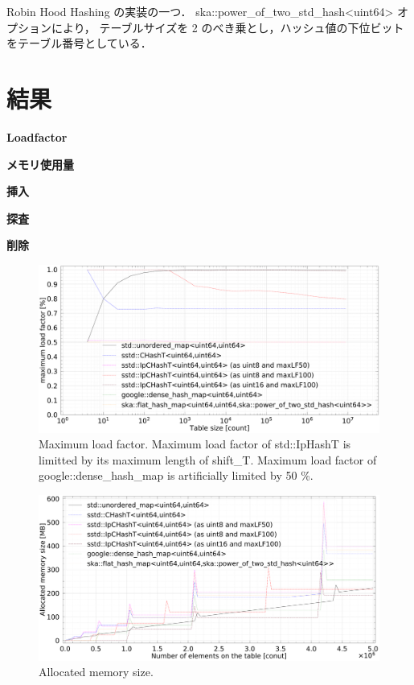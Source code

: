 Robin Hood Hashing の実装の一つ．
ska::power\_of\_two\_std\_hash<uint64> オプションにより，
テーブルサイズを 2 のべき乗とし，ハッシュ値の下位ビットをテーブル番号としている．

\leavevmode \newline


\section{結果}

{\bf Loadfactor}

{\bf メモリ使用量}

{\bf 挿入}

{\bf 探査}

{\bf 削除}

\begin{figure}[h]
  \includegraphics[scale=0.24]{./fig_bench/maxLoadFactor_med.pdf}
  \caption{
    Maximum load factor. Maximum load factor of std::IpHashT is limitted by its maximum length of shift\_T.
    Maximum load factor of google::dense\_hash\_map is artificially limited by 50 \%.
  }
  \label{fig_bench_LF}
\end{figure}

\begin{figure}[h]
  \hspace{-1mm}
  \includegraphics[scale=0.24]{./fig_bench/usedMemory.pdf}
  \caption{ Allocated memory size. }
  \label{fig_bench_memory}
\end{figure}

